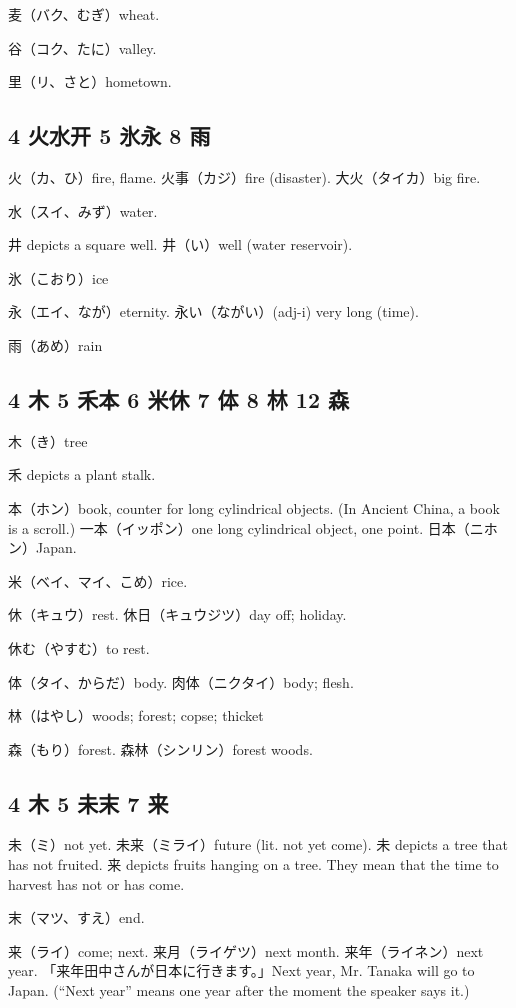 麦（バク、むぎ）wheat.

谷（コク、たに）valley.

里（リ、さと）hometown.

\subsection{4 火水开 5 氷永 8 雨}

火（カ、ひ）fire, flame.
火事（カジ）fire (disaster).
大火（タイカ）big fire.

水（スイ、みず）water.

井 depicts a square well.
井（い）well (water reservoir).

氷（こおり）ice

永（エイ、なが）eternity.
永い（ながい）(adj-i) very long (time).

雨（あめ）rain

\subsection{4 木 5 禾本 6 米休 7 体 8 林 12 森}

木（き）tree

禾 depicts a plant stalk.

本（ホン）book, counter for long cylindrical objects.
(In Ancient China, a book is a scroll.)
一本（イッポン）one long cylindrical object, one point.
日本（ニホン）Japan.

米（ベイ、マイ、こめ）rice.

休（キュウ）rest.
休日（キュウジツ）day off; holiday.

休む（やすむ）to rest.

体（タイ、からだ）body.
肉体（ニクタイ）body; flesh.

林（はやし）woods; forest; copse; thicket

森（もり）forest.
森林（シンリン）forest woods.

\subsection{4 木 5 未末 7 来}

未（ミ）not yet.
未来（ミライ）future (lit. not yet come).
未 depicts a tree that has not fruited.
来 depicts fruits hanging on a tree.
They mean that the time to harvest has not or has come.

末（マツ、すえ）end.

来（ライ）come; next.
来月（ライゲツ）next month.
来年（ライネン）next year.
「来年田中さんが日本に行きます。」Next year, Mr. Tanaka will go to Japan.
(``Next year'' means one year after the moment the speaker says it.)

